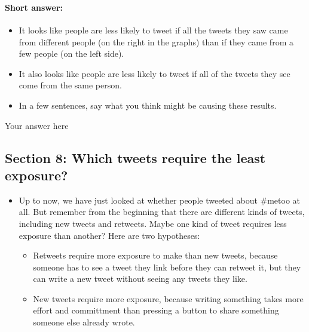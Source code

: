 \documentclass[11pt]{article}
\providecommand{\tightlist}{%
      \setlength{\itemsep}{0pt}\setlength{\parskip}{0pt}}
\begin{document}
    \begin{center}
    \end{center}
    { \hspace*{\fill} \\}
    
    \begin{center}
    \end{center}
    { \hspace*{\fill} \\}
    
    \hypertarget{short-answer}{%
\paragraph{Short answer:}\label{short-answer}}

\begin{itemize}
\tightlist
\item
  It looks like people are less likely to tweet if all the tweets they
  saw came from different people (on the right in the graphs) than if
  they came from a few people (on the left side).
\item
  It also looks like people are less likely to tweet if all of the
  tweets they see come from the same person.
\item
  In a few sentences, say what you think might be causing these results.
\end{itemize}

    Your answer here

    \hypertarget{section-8-which-tweets-require-the-least-exposure}{%
\subsection{Section 8: Which tweets require the least
exposure?}\label{section-8-which-tweets-require-the-least-exposure}}

\begin{itemize}
\tightlist
\item
  Up to now, we have just looked at whether people tweeted about \#metoo
  at all. But remember from the beginning that there are different kinds
  of tweets, including new tweets and retweets. Maybe one kind of tweet
  requires less exposure than another? Here are two hypotheses:

  \begin{itemize}
  \tightlist
  \item
    Retweets require more exposure to make than new tweets, because
    someone has to see a tweet they link before they can retweet it, but
    they can write a new tweet without seeing any tweets they like.
  \item
    New tweets require more exposure, because writing something takes
    more effort and committment than pressing a button to share
    something someone else already wrote.
  \end{itemize}
\end{itemize}
\end{document}
